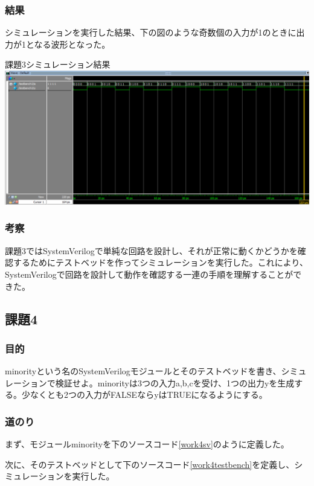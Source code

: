 \documentclass[a4paper]{jarticle}
\begin{document}
\subsubsection{結果}
シミュレーションを実行した結果、下の図のような奇数個の入力が1のときに出力が1となる波形となった。
\begin{center}
	課題3シミュレーション結果
	\includegraphics[width=15cm]{3-m.PNG}
\end{center}
\subsubsection{考察}
課題3ではSystemVerilogで単純な回路を設計し、それが正常に動くかどうかを確認するためにテストベッドを作ってシミュレーションを実行した。これにより、SystemVerilogで回路を設計して動作を確認する一連の手順を理解することができた。
\subsection{課題4}
\subsubsection{目的}
minorityという名のSystemVerilogモジュールとそのテストベッドを書き、シミュレーションで検証せよ。minorityは3つの入力a,b,cを受け、1つの出力yを生成する。少なくとも2つの入力がFALSEならyはTRUEになるようにする。
\subsubsection{道のり}
まず、モジュールminorityを下のソースコード\ref{work4sv}のように定義した。

次に、そのテストベッドとして下のソースコード\ref{work4testbench}を定義し、シミュレーションを実行した。

\end{document}

